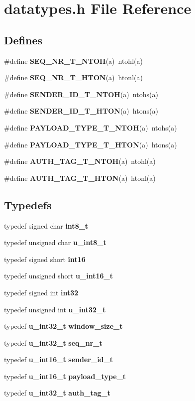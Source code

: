 \section{datatypes.h File Reference}
\label{datatypes_8h}
\subsection*{Defines}
\begin{CompactItemize}
\item 
\#define {\bf SEQ\_\-NR\_\-T\_\-NTOH}(a)~ntohl(a)
\item 
\#define {\bf SEQ\_\-NR\_\-T\_\-HTON}(a)~htonl(a)
\item 
\#define {\bf SENDER\_\-ID\_\-T\_\-NTOH}(a)~ntohs(a)
\item 
\#define {\bf SENDER\_\-ID\_\-T\_\-HTON}(a)~htons(a)
\item 
\#define {\bf PAYLOAD\_\-TYPE\_\-T\_\-NTOH}(a)~ntohs(a)
\item 
\#define {\bf PAYLOAD\_\-TYPE\_\-T\_\-HTON}(a)~htons(a)
\item 
\#define {\bf AUTH\_\-TAG\_\-T\_\-NTOH}(a)~ntohl(a)
\item 
\#define {\bf AUTH\_\-TAG\_\-T\_\-HTON}(a)~htonl(a)
\end{CompactItemize}
\subsection*{Typedefs}
\begin{CompactItemize}
\item 
typedef signed char {\bf int8\_\-t}
\item 
typedef unsigned char {\bf u\_\-int8\_\-t}
\item 
typedef signed short {\bf int16}
\item 
typedef unsigned short {\bf u\_\-int16\_\-t}
\item 
typedef signed int {\bf int32}
\item 
typedef unsigned int {\bf u\_\-int32\_\-t}
\item 
typedef {\bf u\_\-int32\_\-t} {\bf window\_\-size\_\-t}
\item 
typedef {\bf u\_\-int32\_\-t} {\bf seq\_\-nr\_\-t}
\item 
typedef {\bf u\_\-int16\_\-t} {\bf sender\_\-id\_\-t}
\item 
typedef {\bf u\_\-int16\_\-t} {\bf payload\_\-type\_\-t}
\item 
typedef {\bf u\_\-int32\_\-t} {\bf auth\_\-tag\_\-t}
\end{CompactItemize}


